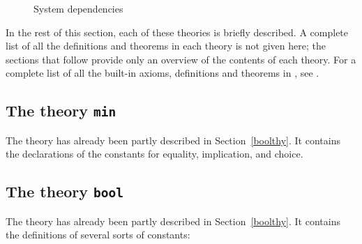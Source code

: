 
\begin{figure}
\centerline{}
\caption{System dependencies}
\end{figure}

\noindent In the rest of this section, each of these theories is briefly
described.  A complete list of all the definitions and theorems in each
theory is not given here; the sections that follow provide only an
overview of the contents of each theory.  For a complete list of all the
built-in axioms, definitions and theorems in \HOL, see \REFERENCE.

\subsection{The theory {\tt min}}\label{minTheory}

The theory  has already been partly described in
Section~\ref{boolthy}.
It contains the declarations of the constants for equality, implication,
and choice.

\subsection{The theory {\tt bool}}\label{boolfull}

The theory  has already been partly described in
Section~\ref{boolthy}.
It contains the definitions of several sorts of constants:

